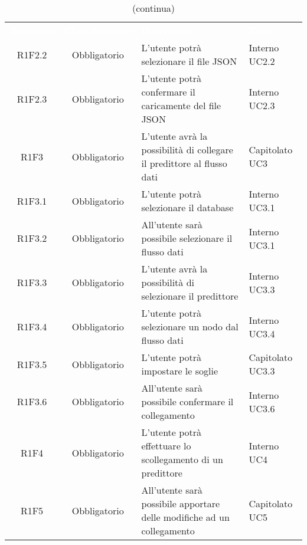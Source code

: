 \begin{table}[H]
\centering\renewcommand{\arraystretch}{1.5}
\caption{(continua)}
\vspace{0.2cm}
\begin{tabular}{ c  c  p{4 cm} C{2.5 cm} }
\textcolor{white}{\textbf{Requisito}} & \textcolor{white}{\textbf{Classificazione}} & 
\textcolor{white}{\textbf{Descrizione}} & \textcolor{white}{\textbf{Fonti}} \\
R1F2.2 & Obbligatorio & L’utente potrà selezionare il file JSON &  Interno UC2.2\\
R1F2.3 & Obbligatorio & L’utente potrà confermare il caricamente del file JSON &  Interno UC2.3\\
R1F3 & Obbligatorio & L’utente avrà la possibilità di collegare il predittore al flusso dati &  Capitolato UC3\\
R1F3.1 & Obbligatorio & L’utente potrà selezionare il database &  Interno UC3.1\\
R1F3.2 & Obbligatorio & All’utente sarà possibile selezionare il flusso dati &  Interno UC3.1\\
R1F3.3 & Obbligatorio & L’utente avrà la possibilità di selezionare il predittore  &  Interno UC3.3\\
R1F3.4 & Obbligatorio & L’utente potrà selezionare un nodo dal flusso dati &  Interno UC3.4\\
R1F3.5 & Obbligatorio & L’utente potrà impostare le soglie &  Capitolato UC3.3\\
R1F3.6 & Obbligatorio & All’utente sarà possibile confermare il collegamento &  Interno UC3.6\\
R1F4 & Obbligatorio & L’utente potrà effettuare lo scollegamento di un predittore &  Interno UC4\\
R1F5 & Obbligatorio & All’utente sarà possibile apportare delle modifiche ad un collegamento & Capitolato UC5\\
\end{tabular}
\end{table}


